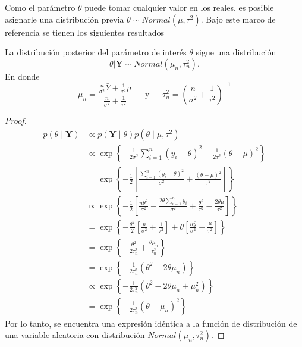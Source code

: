     Como el par\'ametro $\theta$ puede tomar cualquier valor en los reales, es posible asignarle una distribuci\'on previa $\theta \sim Normal(\mu,\tau^2)$. Bajo este marco de referencia se tienen los siguientes resultados
    
    \begin{Res}\label{Res_pos_theta}
    La distribuci\'on posterior del par\'ametro de inter\'es $\theta$ sigue una distribuci\'on
    \begin{equation*}
    \theta|\mathbf{Y} \sim Normal(\mu_n,\tau^2_n).
    \end{equation*}
    En donde
    \begin{equation}\label{tau_sigma_n}
    \mu_n=\frac{\frac{n}{\sigma^2}\bar{Y}+\frac{1}{\tau^2}\mu}{\frac{n}{\sigma^2}+\frac{1}{\tau^2}}
    \ \ \ \ \ \ \ \text{y} \ \ \ \ \ \ \
    \tau_n^2=\left(\frac{n}{\sigma^2}+\frac{1}{\tau^2}\right)^{-1}
    \end{equation}
    \end{Res}
    
    \begin{proof}
    \begin{align*}
    p(\theta \mid \mathbf{Y})&\propto p(\mathbf{Y} \mid \theta)p(\theta \mid \mu,\tau^2)\\
    &\propto \exp\left\{-\frac{1}{2\sigma^2}\sum_{i=1}^n(y_i-\theta)^2-\frac{1}{2\tau^2}(\theta-\mu)^2\right\}\\
    &= \exp\left\{-\frac{1}{2}\left[\frac{\sum_{i=1}^n(y_i-\theta)^2}{\sigma^2}+\frac{(\theta-\mu)^2}{\tau^2}\right]\right\}\\
    &\propto \exp\left\{-\frac{1}{2}\left[\frac{n\theta^2}{\sigma^2}-\frac{2\theta\sum_{i=1}^ny_i}{\sigma^2}+\frac{\theta^2}{\tau^2}-\frac{2\theta\mu}{\tau^2}\right]\right\}\\
    &= \exp\left\{-\frac{\theta^2}{2}\left[\frac{n}{\sigma^2}+\frac{1}{\tau^2}\right]+
    \theta\left[\frac{n\bar{y}}{\sigma^2}+\frac{\mu}{\tau^2}\right]\right\}\\
    &= \exp\left\{-\frac{\theta^2}{2\tau^2_n}+\frac{\theta\mu_n}{\tau_n^2}\right\}\\
    &= \exp\left\{-\frac{1}{2\tau^2_n}(\theta^2-2\theta\mu_n)\right\}\\
    &\propto \exp\left\{-\frac{1}{2\tau^2_n}(\theta^2-2\theta\mu_n+\mu_n^2)\right\}\\
    &= \exp\left\{-\frac{1}{2\tau^2_n}(\theta-\mu_n)^2\right\}
    \end{align*}
    Por lo tanto, se encuentra una expresi\'on id\'entica a la funci\'on de distribuci\'on de una variable aleatoria con distribuci\'on $Normal(\mu_n,\tau_n^2)$.
    \end{proof}
    
